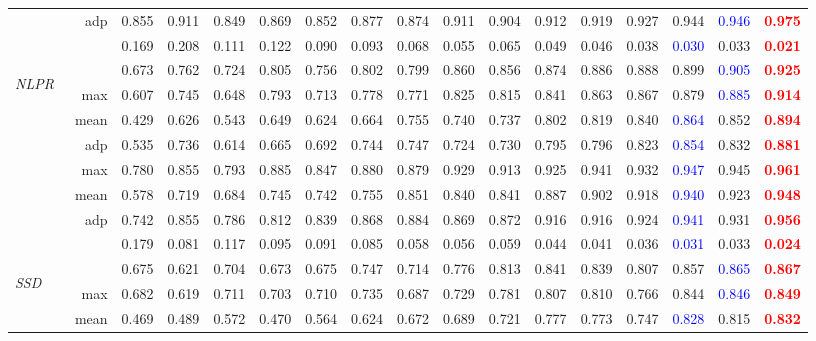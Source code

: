 \documentclass[journal]{IEEEtran}
\newcommand{\trb}[1]{\textbf{\textcolor{red}{#1}}}
\newcommand{\tbb}[1]{\textcolor{blue}{#1}}
\newcommand{\NLPR}{\textit{NLPR}~\cite{peng2014rgbd}}
\newcommand{\SSD}{\textit{SSD}~\cite{zhu2017three}}
\begin{document}
\begin{table*}[t!]
\begin{tabular}{lr|ccccc|ccccccccc|c}
		& adp      & 0.855 & 0.911 & 0.849 & 0.869 & 0.852 & 0.877 & 0.874 & 0.911 & 0.904 & 0.912 & 0.919 & 0.927 & 0.944 & \tbb{0.946} & \trb{0.975} \\
		&  & 0.169 & 0.208 & 0.111 & 0.122 & 0.090 & 0.093 & 0.068 & 0.055 & 0.065 & 0.049 & 0.046 & 0.038 & \tbb{0.030} & 0.033 & \trb{0.021} \\
		\midrule
		\multirow{8}{*}{\begin{sideways}\NLPR\end{sideways}}
		&     & 0.673 & 0.762 & 0.724 & 0.805 & 0.756 & 0.802 & 0.799 & 0.860 & 0.856 & 0.874 & 0.886 & 0.888 & 0.899 & \tbb{0.905} & \trb{0.925} \\
		& max      & 0.607 & 0.745 & 0.648 & 0.793 & 0.713 & 0.778 & 0.771 & 0.825 & 0.815 & 0.841 & 0.863 & 0.867 & 0.879 & \tbb{0.885} & \trb{0.914} \\
		& mean      & 0.429 & 0.626 & 0.543 & 0.649 & 0.624 & 0.664 & 0.755 & 0.740 & 0.737 & 0.802 & 0.819 & 0.840 & \tbb{0.864} & 0.852 & \trb{0.894} \\
		& adp      & 0.535 & 0.736 & 0.614 & 0.665 & 0.692 & 0.744 & 0.747 & 0.724 & 0.730 & 0.795 & 0.796 & 0.823 & \tbb{0.854} & 0.832 & \trb{0.881} \\
		& max        & 0.780 & 0.855 & 0.793 & 0.885 & 0.847 & 0.880 & 0.879 & 0.929 & 0.913 & 0.925 & 0.941 & 0.932 & \tbb{0.947} & 0.945 & \trb{0.961} \\
		& mean      & 0.578 & 0.719 & 0.684 & 0.745 & 0.742 & 0.755 & 0.851 & 0.840 & 0.841 & 0.887 & 0.902 & 0.918 & \tbb{0.940} & 0.923 & \trb{0.948} \\
		& adp      & 0.742 & 0.855 & 0.786 & 0.812 & 0.839 & 0.868 & 0.884 & 0.869 & 0.872 & 0.916 & 0.916 & 0.924 & \tbb{0.941} & 0.931 & \trb{0.956} \\
		&  & 0.179 & 0.081 & 0.117 & 0.095 & 0.091 & 0.085 & 0.058 & 0.056 & 0.059 & 0.044 & 0.041 & 0.036 & \tbb{0.031} & 0.033 & \trb{0.024} \\
		\midrule
		\multirow{8}{*}{\begin{sideways}\SSD\end{sideways}}
		&     & 0.675 & 0.621 & 0.704 & 0.673 & 0.675 & 0.747 & 0.714 & 0.776 & 0.813 & 0.841 & 0.839 & 0.807 & 0.857 & \tbb{0.865} & \trb{0.867} \\
		& max      & 0.682 & 0.619 & 0.711 & 0.703 & 0.710 & 0.735 & 0.687 & 0.729 & 0.781 & 0.807 & 0.810 & 0.766 & 0.844 & \tbb{0.846} & \trb{0.849} \\
		& mean      & 0.469 & 0.489 & 0.572 & 0.470 & 0.564 & 0.624 & 0.672 & 0.689 & 0.721 & 0.777 & 0.773 & 0.747 & \tbb{0.828} & 0.815 & \trb{0.832} \\

\end{tabular}
\end{table*}
\end{document}
